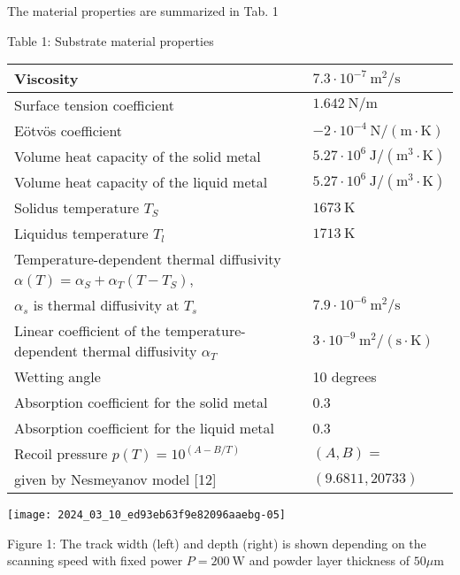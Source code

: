 \documentclass[10pt]{article}
\begin{document}
The material properties are summarized in Tab. 1

Table 1: Substrate material properties

\begin{center}
\begin{tabular}{ll}
\hline
Viscosity & $7.3 \cdot 10^{-7} \mathrm{~m}^{2} / \mathrm{s}$ \\
\hline
Surface tension coefficient & $1.642 \mathrm{~N} / \mathrm{m}$ \\
\hline
Eötvös coefficient & $-2 \cdot 10^{-4} \mathrm{~N} /(\mathrm{m} \cdot \mathrm{K})$ \\
\hline
Volume heat capacity of the solid metal & $5.27 \cdot 10^{6} \mathrm{~J} /\left(\mathrm{m}^{3} \cdot \mathrm{K}\right)$ \\
\hline
Volume heat capacity of the liquid metal & $5.27 \cdot 10^{6} \mathrm{~J} /\left(\mathrm{m}^{3} \cdot \mathrm{K}\right)$ \\
\hline
Solidus temperature $T_{S}$ & $1673 \mathrm{~K}$ \\
\hline
Liquidus temperature $T_{l}$ & $1713 \mathrm{~K}$ \\
\hline
Temperature-dependent thermal diffusivity $\alpha(T)=\alpha_{S}+\alpha_{T}\left(T-T_{S}\right)$, &  \\
$\alpha_{s}$ is thermal diffusivity at $T_{s}$ & $7.9 \cdot 10^{-6} \mathrm{~m}^{2} / \mathrm{s}$ \\
Linear coefficient of the temperature-dependent thermal diffusivity $\alpha_{T}$ & $3 \cdot 10^{-9} \mathrm{~m}^{2} /(\mathrm{s} \cdot \mathrm{K})$ \\
\hline
Wetting angle & 10 degrees \\
\hline
Absorption coefficient for the solid metal & 0.3 \\
\hline
Absorption coefficient for the liquid metal & 0.3 \\
\hline
Recoil pressure $p(T)=10^{(A-B / T)}$ & $(A, B)=$ \\
given by Nesmeyanov model [12] & $(9.6811,20733)$ \\
\hline
\end{tabular}
\end{center}

\begin{center}
\texttt{[image: 2024\_03\_10\_ed93eb63f9e82096aaebg-05]}
\end{center}

Figure 1: The track width (left) and depth (right) is shown depending on the scanning speed with fixed power $P=200 \mathrm{~W}$ and powder layer thickness of $50 \mu \mathrm{m}$
\end{document}
